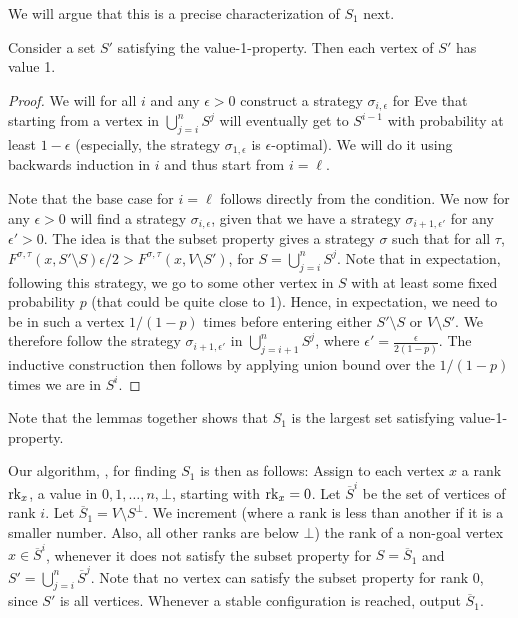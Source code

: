 We will argue that this is a precise characterization of $S_1$ next.

\begin{lemma}
Consider a set $S'$ satisfying the value-1-property.
Then each vertex of $S'$ has value 1.\label{lem:sufficent_for_value1}
\end{lemma}
\begin{proof}
We will for all $i$ and any $\epsilon>0$ construct a strategy $\sigma_{i,\epsilon}$ for Eve that starting from a vertex in $\bigcup_{j=i}^n S^j$ will eventually get to $S^{i-1}$ with probability at least $1-\epsilon$ (especially, the strategy $\sigma_{1,\epsilon}$ is $\epsilon$-optimal). We will do it using backwards induction in $i$ and thus start from $i=\ell$.

Note that the base case for $i=\ell$ follows directly from the condition.
We now for any $\epsilon>0$ will find a strategy $\sigma_{i,\epsilon}$, given that we have a strategy $\sigma_{i+1,\epsilon'}$ for any $\epsilon'>0$.
The idea is that the subset property gives a strategy $\sigma$ such that for all $\tau$, $F^{\sigma,\tau}(x,S'\setminus S)\epsilon/2 >F^{\sigma,\tau}(x,V\setminus S')$, for $S=\bigcup_{j=i}^{n} S^j$.
Note that in expectation, following this strategy, we go to some other vertex in $S$ with at least some fixed probability $p$ (that could be quite close to 1).
Hence, in expectation, we need to be in such a vertex $1/(1-p)$ times before entering either $S'\setminus S$ or $V\setminus S'$.
We therefore follow the strategy $\sigma_{i+1,\epsilon'}$ in $\bigcup_{j=i+1}^n S^j$, where $\epsilon'=\frac{\epsilon}{2(1-p)}$.
The inductive construction then follows by applying union bound over the $1/(1-p)$ times we are in $S^i$.
\end{proof}
Note that the lemmas together shows that $S_1$ is the largest set satisfying value-1-property.


Our algorithm, \crgLim, for finding $S_1$ is then as follows:
Assign to each vertex $x$ a rank $\text{rk}_x$, a value in $0,1,\dots,n,\bot$, starting with $\text{rk}_x=0$.
Let $\overline{S}^i$ be the set of vertices of rank $i$.
Let $\overline{S}_1=V\setminus S^{\bot}$.
We increment (where a rank is less than another if it is a smaller number. Also, all other ranks are below $\bot$) the rank of a non-goal vertex $x\in \overline{S}^i$, whenever it does not satisfy the subset property for $S=\overline{S}_1$ and $S'=\bigcup_{j=i}^n \overline{S}^j$.
Note that no vertex can satisfy the subset property for rank 0, since $S'$ is all vertices.
Whenever a stable configuration is reached, output $\overline{S}_1$.


